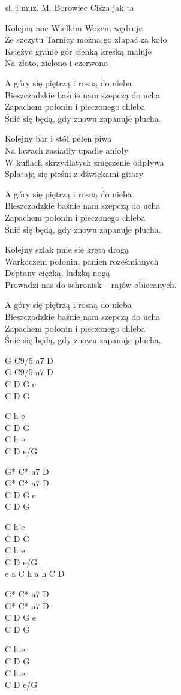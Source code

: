 {sł. i muz. M. Borowiec}
{Cisza jak ta}
\begin{text}
Kolejna noc Wielkim Wozem wędruje\\
Ze szczytu Tarnicy można go złapać za koło\\
Księżyc granie gór cienką kreską maluje\\
Na złoto, zielono i czerwono

\vin A góry się piętrzą i rosną do nieba\\
\vin Bieszczadzkie baśnie nam szepczą do ucha\\
\vin Zapachem połonin i pieczonego chleba\\
\vin Śnić się będą, gdy znowu zapanuje plucha.

Kolejny bar i stół pełen piwa\\
Na ławach zasiadły upadłe anioły\\
W kuflach skrzydlatych zmęczenie odpływa\\
Splatają się pieśni z dźwiękami gitary

\vin A góry się piętrzą i rosną do nieba\\
\vin Bieszczadzkie baśnie nam szepczą do ucha\\
\vin Zapachem połonin i pieczonego chleba\\
\vin Śnić się będą, gdy znowu zapanuje plucha.

\hfill\break
Kolejny szlak pnie się krętą drogą\\
Warkoczem połonin, panien roześmianych\\
Deptany ciężką, ludzką nogą\\
Prowadzi nas do schronisk – rajów obiecanych.

\vin A góry się piętrzą i rosną do nieba\\
\vin Bieszczadzkie baśnie nam szepczą do ucha\\
\vin Zapachem połonin i pieczonego chleba\\
\vin Śnić się będą, gdy znowu zapanuje plucha.
\end{text}
\begin{chord}
G C9/5 a7 D\\
G C9/5 a7 D\\
C D G e\\
C D G

C h e\\
C D G\\
C h e\\
C D e/G

G* C* a7 D\\
G* C* a7 D\\
C D G e\\
C D G

C h e\\
C D G\\
C h e\\
C D e/G\\
e a C h a h C D

G* C* a7 D\\
G* C* a7 D\\
C D G e\\
C D G

C h e\\
C D G\\
C h e\\
C D e/G
\end{chord}
